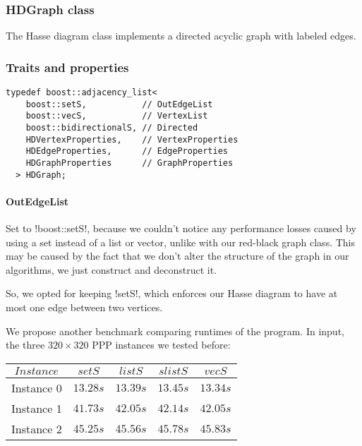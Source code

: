 \pagebreak

\subsubsection{HDGraph class}\label{section:hdgraph-class}

The Hasse diagram class implements a directed acyclic graph with labeled edges.

\subsubsection*{Traits and properties}


\begin{lstlisting}[belowskip=0pt]
  typedef boost::adjacency_list<
    boost::setS,           // OutEdgeList
    boost::vecS,           // VertexList
    boost::bidirectionalS, // Directed
    HDVertexProperties,    // VertexProperties
    HDEdgeProperties,      // EdgeProperties
    HDGraphProperties      // GraphProperties
  > HDGraph;
\end{lstlisting}

\paragraph{OutEdgeList}

Set to !boost::setS!, because we couldn't notice any performance losses caused by using a set instead of a list or vector, unlike with our red-black graph class.
This may be caused by the fact that we don't alter the structure of the graph in our algorithms, we just construct and deconstruct it.

So, we opted for keeping !setS!, which enforces our Hasse diagram to have at most one edge between two vertices.

We propose another benchmark comparing runtimes of the program. In input, the three $320 \times 320$ PPP instances we tested before:

\begin{center}
  \begin{tabular}{c | c c c c}
    $Instance$ & $setS$   & $listS$  & $slistS$ & $vecS$ \\
    \hline
    Instance 0 & $13.28s$ & $13.39s$ & $13.45s$ & $13.34s$ \\
    Instance 1 & $41.73s$ & $42.05s$ & $42.14s$ & $42.05s$ \\
    Instance 2 & $45.25s$ & $45.56s$ & $45.78s$ & $45.83s$
  \end{tabular}
\end{center}

